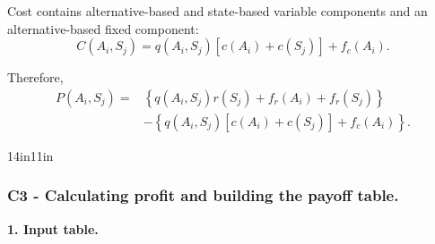 	Cost contains alternative-based and state-based variable components and an
	alternative-based fixed component:
	\[
	C(A_i,S_j)
	=
	q(A_i,S_j)
	\left[
	c(A_i)+c(S_j)
	\right]
	+
	f_c(A_i).
	\]

	Therefore,
	\[
	\begin{aligned}
		P(A_i,S_j)
		={}&
		\left\{
		q(A_i,S_j)r(S_j)
		+
		f_r(A_i)
		+
		f_r(S_j)
		\right\}
		\\
		&-
		\left\{
		q(A_i,S_j)
		\left[
		c(A_i)+c(S_j)
		\right]
		+
		f_c(A_i)
		\right\}.
	\end{aligned}
	\]


	\begin{CalculationLandscape}{14in}{11in}
\subsubsection*{C3 - Calculating profit and building the payoff table.}
	\label{subsec:problem18-cold-storage-export-contract-c3}

\textbf{1. Input table.}


\end{CalculationLandscape}
